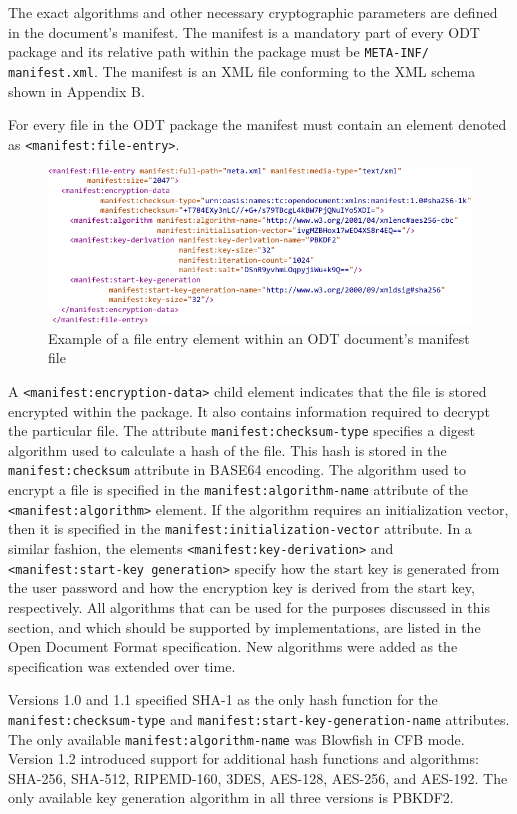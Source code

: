 \documentclass[11pt,oneside]{fithesis2}
\begin{document}
The exact algorithms and other necessary cryptographic parameters are defined in the document's manifest. The manifest is a mandatory part of every ODT package and its relative path within the package must be \texttt{META-INF/}
\texttt{manifest.xml}. The manifest is an XML file conforming to the XML schema shown in Appendix B.

For every file in the ODT package the manifest must contain an element denoted as \texttt{<manifest:file-entry>}.

\begin{figure}[ht]
	\centering
	\includegraphics[width=1\textwidth]{figures/manifest_snippet.pdf}
	\caption{Example of a file entry element within an ODT document's manifest file}
	\label{manifest_snippet}
\end{figure}

A \texttt{<manifest:encryption-data>} child element indicates that the file is stored encrypted within the package. It also contains information required to decrypt the particular file. The attribute \texttt{manifest:checksum-type} specifies a digest algorithm used to calculate a hash of the file. This hash is stored in the \texttt{manifest:checksum} attribute in BASE64 encoding. 
The algorithm used to encrypt a file is specified in the \texttt{manifest:algorithm-name} attribute of the \texttt{<manifest:algorithm>} element. If the algorithm requires an initialization vector, then it is specified in the \texttt{manifest:initialization-vector} attribute.
In a similar fashion, the elements \texttt{<manifest:key-derivation>} and \texttt{<manifest:start-key generation>} specify how the start key is generated from the user password and how the encryption key is derived from the start key, respectively.
All algorithms that can be used for the purposes discussed in this section, and which should be supported by implementations, are listed in the Open Document Format specification. New algorithms were added as the specification was extended over time. 

Versions 1.0 and 1.1 specified SHA-1 as the only hash function for the \texttt{manifest:checksum-type} and \texttt{manifest:start-key-generation-name} attributes. The only available \texttt{manifest:algorithm-name} was Blowfish in CFB mode. Version 1.2 introduced support for additional hash functions and algorithms: SHA-256, SHA-512, RIPEMD-160, 3DES, AES-128, AES-256, and AES-192. The only available key generation algorithm in all three versions is PBKDF2.
\end{document}
